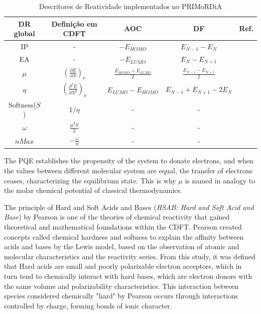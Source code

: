 \documentclass[a4paper,11pt]{refart}
\begin{document}
	\hspace*{-\leftmarginwidth}
	\begin{minipage}{\fullwidth}
		\begin{table}[H]
			\centering	
			\caption{Descritores de Reatividade implementados no PRIMoRDiA}
			\begin{tabular}{c|c|c|c|c}
				\toprule
				DR global & Definição em CDFT  & AOC & DF & Ref. \\
				\midrule
				IP & -  & $- E_{HOMO}$ & $E_{N-1}-E_{N}$  &  \\  \hline	
				EA & -  & $- E_{LUMO}$ & $E_{N}-E_{N+1}$ & \\ \hline	
				$\mu$  & $\left(\frac{\partial E}{\partial N} \right)_\nu$  & $\frac{E_{HOMO} + E_{LUMO}}{2}$ &$\frac{E_{N-1}-E_{N+1}}{2}$ & \cite{ribeiro2017atlas}\\ \hline			
				$\eta$  & $\left(\frac{\partial ^2  E}{\partial N ^2} \right)_\nu$ &$E_{LUMO} - E_{HOMO}$ &$E_{N-1}+E_{N+1}-2E_{N}$ & \cite{parr1983absolute}\\ \hline
				Softness($S$)  & $1/\eta$  & - & -  & \cite{parr1983absolute} \\ \hline
				$\omega$  & $\frac{\mu^2S}{2}$  &-  &-  & \cite{cedillo2012local} \\ \hline
				$nMax$  & $-\frac{\omega}{\eta} $ & - & - & \cite{cedillo2012local}  \\ 
				\bottomrule
			\end{tabular} 
			\label{tab1}	
		\end{table}	
	\end{minipage}

	The PQE establishes the propensity of the system to donate electrons, and when the values between different molecular system are equal, the transfer of electrons ceases, characterizing the equilibrium state\cite{parr1983absolute}. This is why $\mu$ is named in analogy to the molar chemical potential of classical thermodynamics.

	The principle of Hard and Soft Acids and Bases (\textit{HSAB: Hard and Soft Acid and Base}) by Pearson\cite{pearson1987recent} is one of the theories of chemical reactivity that gained theoretical and mathematical foundations within the CDFT. Pearson created concepts called chemical hardness and softness to explain the affinity between acids and bases by the Lewis model, based on the observation of atomic and molecular characteristics and the reactivity series\cite{Pearson1963}. From this study, it was defined that Hard acids are small and poorly polarizable electron acceptors, which in turn tend to chemically interact with hard bases, which are electron donors with the same volume and polarizability characteristics. This interaction between species considered chemically "hard" by Pearson occurs through interactions controlled by charge, forming bonds of ionic character.
\end{document}
